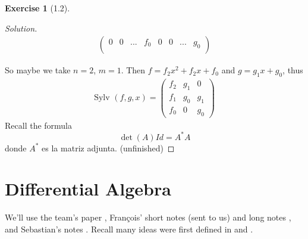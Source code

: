 \documentclass{article}
\theoremstyle{definition}
\newtheorem*{exer*}{Exercise}
\newcommand{\Sylv}{\text{Sylv }}
\begin{document}
\begin{exer*}[1.2]
\begin{proof}[Solution]
\begin{align*}
\begin{pmatrix}
   			0&0&...&f_0&0&0&...&g_0\\
		\end{pmatrix}
	\end{align*}\par	
 So maybe we take $n=2$, $m=1$. Then $f=f_2x^2+f_2x+f_0$ and $g=g_1x+g_0$, thus
 \begin{align*}\Sylv(f,g,x)=
     \begin{pmatrix}
         f_2&g_1&0\\
         f_1&g_0&g_1\\
         f_0&0&g_0
     \end{pmatrix}
 \end{align*}
Recall the formula $$\det(A)Id=A^*A$$
donde $A^*$ es la matriz adjunta. (unfinished)
\end{proof}
\end{exer*}
\newpage

\section{Differential Algebra}
\label{difalg1}
We'll use the team's paper \cite{falkensteiner2020fundamental}, François' short notes (sent to us) and long notes \cite{Francois}, and Sebastian's notes \cite{Sebastian}. Recall many ideas were first defined in \cite{kolchin1973differential} and \cite{ritt1950differential}.
\end{document}
